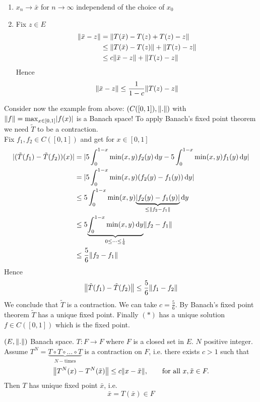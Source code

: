 \begin{bemerkung}
	\begin{enumerate}[(1)]
		\item $x_n \to \bar{x}$ for $n \to \infty$ independend of the choice of $x_0$
		\item Fix $z \in E$
		\begin{align*}
			\norm{\bar{x}-z} &= \norm{T(\bar{x})- T(z) + T(z) -z} \\
			&\leq \norm{T(\bar{x})-T(z)} + \norm{T(z) -z} \\
			&\leq c \norm{\bar{x}-z} + \norm{T(z) - z} 
		\end{align*}
		Hence 
		\[
			\norm{\bar{x}-z} \leq \frac{1}{1-c}\norm{T(z)-z}
		\]
	\end{enumerate}
\end{bemerkung}
\begin{beispiel}
	Consider now the example from above: $(C([0,1]), \norm{.})$ with $\norm{f} = \max_{x \in [0,1]}\abs{f(x)}$ is a Banach space! To apply Banach's fixed point theorem we need $\tilde T$ to be a contraction. \\
	Fix $f_1,f_2 \in C([0,1])$ and get for $x \in [0,1]$
	\begin{align*}
		\abs{(\tilde T(f_1)- \tilde T(f_2))(x)} & = \abs{5 \int_{0}^{1-x} \min(x,y)f_2(y) \,\mathrm{d}y - 5 \int_{0}^{1-x}\min(x,y)f_1(y) \,\mathrm{d}y} \\
		&= \abs{5 \int_{0}^{1-x} \min(x,y)(f_2(y)-f_1(y)) \,\mathrm{d}y} \\
		&\leq 5 \int_{0}^{1-x} \min(x,y) \underset{\leq \norm{f_2-f_1}}{\underbrace{\abs{f_2(y)-f_1(y)}}} \,\mathrm{d}y \\
		&\leq 5 \underset{0 \leq  \dots \leq \frac{1}{6}}{\underbrace{\int_{0}^{1-x} \min(x,y)\,\mathrm{d}y}} \norm{f_2-f_1} \\
		&\leq \frac{5}{6} \norm{f_2-f_1} 
	\end{align*}
	Hence \[
		\norm{\tilde T(f_1)- \tilde T(f_2)} \leq \frac{5}{6} \norm{f_1-f_2}
	\]
	We conclude that $\tilde T$ is a contraction. We can take $c = \frac{5}{6}$. By Banach's fixed point theorem $\tilde T$ has a unique fixed point. Finally $(*)$
	has a unique solution $f \in C([0,1])$ which is the fixed point. 
\end{beispiel}
\begin{theorem}
	$(E, \norm{.})$ Banach space. $T: F \to F$ where $F$ is a closed set in $E$. $N$ positive integer. Assume $T^N = \underset{N-\text{times}}{\underbrace{T \circ T \circ \dots \circ T}}$ is a contraction on $F$, i.e. there exists $c > 1$ such that
	\[
		\norm{T^N(x)- T^N(\tilde x)} \leq c \norm{x-\tilde x}, \qquad \text{for all }x, \tilde x \in F.
	\]
	Then $T$ has unique fixed point $\bar{ x}$, i.e.
	\[
		\bar{x} = T(\bar{x}) \in F
	\]
\end{theorem}

